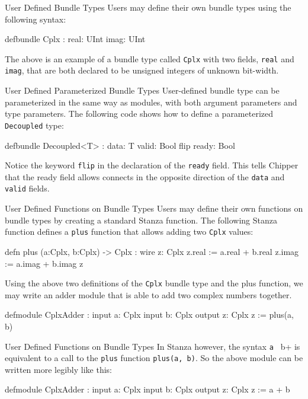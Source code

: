 \documentclass[xcolor=pdflatex,dvipsnames,table]{beamer}
\begin{document}
\begin{frame}[fragile]{User Defined Bundle Types}
Users may define their own bundle types using the following syntax:
\begin{stanza}
defbundle Cplx :
   real: UInt
   imag: UInt
\end{stanza}
The above is an example of a bundle type called \verb+Cplx+ with two fields, \verb+real+ and \verb+imag+, that are both declared to be unsigned integers of unknown bit-width.
\end{frame}

\begin{frame}[fragile]{User Defined Parameterized Bundle Types}
User-defined bundle type can be parameterized in the same way as modules, with both argument parameters and type parameters. The following code shows how to define a parameterized \verb+Decoupled+ type:
\begin{stanza}
defbundle Decoupled<T> :
   data: T
   valid: Bool
   flip ready: Bool
\end{stanza}
\noindent
Notice the keyword \verb+flip+ in the declaration of the \verb+ready+ field. This tells Chipper that the ready field allows connects in the opposite direction of the \verb+data+ and \verb+valid+ fields.
\end{frame}

\begin{frame}[fragile]{User Defined Functions on Bundle Types}
Users may define their own functions on bundle types by creating a standard Stanza function. The following Stanza function defines a \verb+plus+ function that allows adding two \verb+Cplx+ values:
\begin{stanza}
defn plus (a:Cplx, b:Cplx) -> Cplx :
   wire z: Cplx
   z.real := a.real + b.real
   z.imag := a.imag + b.imag
   z
\end{stanza}

\noindent
Using the above two definitions of the \verb+Cplx+ bundle type and the plus function, we may write an adder module that is able to add two complex numbers together.   

\begin{stanza}
defmodule CplxAdder :
   input a: Cplx
   input b: Cplx
   output z: Cplx
   z := plus(a, b)
\end{stanza}
\end{frame}

\begin{frame}[fragile]{User Defined Functions on Bundle Types}
In Stanza however, the syntax \verb+a + b+ is equivalent to a call to the \verb+plus+ function \verb+plus(a, b)+. So the above module can be written more legibly like this:

\begin{stanza}
defmodule CplxAdder :
   input a: Cplx
   input b: Cplx
   output z: Cplx
   z := a + b
\end{stanza}
\end{frame}
\end{document}
